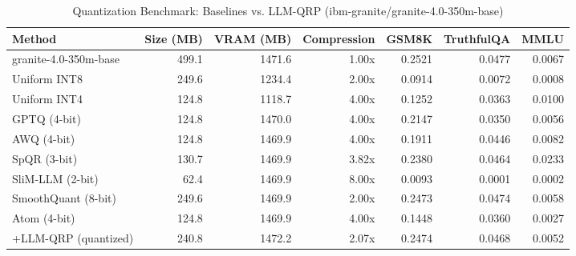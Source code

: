 \begin{table}[htbp]
  \centering
  \small
  \caption{Quantization Benchmark: Baselines vs. LLM-QRP (ibm-granite/granite-4.0-350m-base)}
  \label{tab:benchmark}
  \begin{tabular}{lrrrrrr}
    \toprule
    \textbf{Method} & \textbf{Size (MB)} & \textbf{VRAM (MB)} & \textbf{Compression} & \textbf{GSM8K} & \textbf{TruthfulQA} & \textbf{MMLU} \\
    \midrule
    granite-4.0-350m-base & 499.1 & 1471.6 & 1.00x & 0.2521 & 0.0477 & 0.0067 \\
    Uniform INT8 & 249.6 & 1234.4 & 2.00x & 0.0914 & 0.0072 & 0.0008 \\
    Uniform INT4 & 124.8 & 1118.7 & 4.00x & 0.1252 & 0.0363 & 0.0100 \\
    GPTQ (4-bit) & 124.8 & 1470.0 & 4.00x & 0.2147 & 0.0350 & 0.0056 \\
    AWQ (4-bit) & 124.8 & 1469.9 & 4.00x & 0.1911 & 0.0446 & 0.0082 \\
    SpQR (3-bit) & 130.7 & 1469.9 & 3.82x & 0.2380 & 0.0464 & 0.0233 \\
    SliM-LLM (2-bit) & 62.4 & 1469.9 & 8.00x & 0.0093 & 0.0001 & 0.0002 \\
    SmoothQuant (8-bit) & 249.6 & 1469.9 & 2.00x & 0.2473 & 0.0474 & 0.0058 \\
    Atom (4-bit) & 124.8 & 1469.9 & 4.00x & 0.1448 & 0.0360 & 0.0027 \\
    \midrule
    +LLM-QRP (quantized) & 240.8 & 1472.2 & 2.07x & 0.2474 & 0.0468 & 0.0052 \\
    \bottomrule
  \end{tabular}
\end{table}
